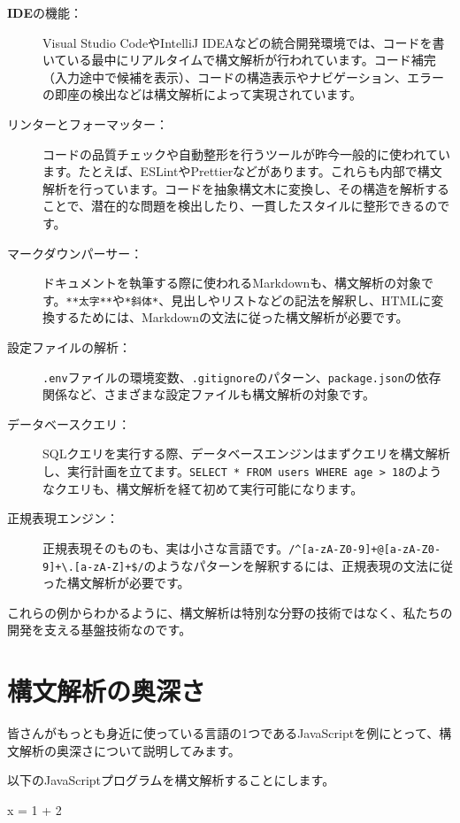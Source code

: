 \begin{description}
  \item[\textbf{\sffamily IDE}の機能：] Visual Studio CodeやIntelliJ
IDEAなどの統合開発環境では、コードを書いている最中にリアルタイムで構文解析が行われています。コード補完（入力途中で候補を表示）、コードの構造表示やナビゲーション、エラーの即座の検出などは構文解析によって実現されています。
\item[リンターとフォーマッター：]
コードの品質チェックや自動整形を行うツールが昨今一般的に使われています。たとえば、ESLintやPrettierなどがあります。これらも内部で構文解析を行っています。コードを抽象構文木に変換し、その構造を解析することで、潜在的な問題を検出したり、一貫したスタイルに整形できるのです。
\item[マークダウンパーサー：]
ドキュメントを執筆する際に使われるMarkdownも、構文解析の対象です。\texttt{**太字**}や\texttt{*斜体*}、見出しやリストなどの記法を解釈し、HTMLに変換するためには、Markdownの文法に従った構文解析が必要です。
\item[設定ファイルの解析：]
\texttt{.env}ファイルの環境変数、\texttt{.gitignore}のパターン、\texttt{package.json}の依存関係など、さまざまな設定ファイルも構文解析の対象です。
\item[データベースクエリ：]
SQLクエリを実行する際、データベースエンジンはまずクエリを構文解析し、実行計画を立てます。\texttt{SELECT\ *\ FROM\ users\ WHERE\ age\ \textgreater{}\ 18}のようなクエリも、構文解析を経て初めて実行可能になります。
\item[正規表現エンジン：]
正規表現そのものも、実は小さな言語です。\texttt{/\^{}{[}a-zA-Z0-9{]}+@{[}a-zA-Z0-9{]}+\textbackslash{}.{[}a-zA-Z{]}+\$/}のようなパターンを解釈するには、正規表現の文法に従った構文解析が必要です。
\end{description}

これらの例からわかるように、構文解析は特別な分野の技術ではなく、私たちの開発を支える基盤技術なのです。

\section*{構文解析の奥深さ}\label{0.4}

皆さんがもっとも身近に使っている言語の1つであるJavaScriptを例にとって、構文解析の奥深さについて説明してみます。

以下のJavaScriptプログラムを構文解析することにします。

\begin{codescreen}{}
x = 1 +
  2
\end{codescreen}

